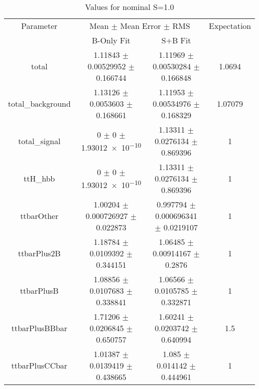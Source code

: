 \begin{table}
\centering
\caption{Values for nominal S=1.0}
\begin{tabular}{cccc}
\toprule
Parameter & \multicolumn{2}{c}{Mean $\pm$ Mean Error $\pm$ RMS} & Expectation\\
 & B-Only Fit & S+B Fit & \\
\midrule
total & \num{1.11843} $\pm$ \num{0.00529952} $\pm$ \num{0.166744} & \num{1.11969} $\pm$ \num{0.00530284} $\pm$ \num{0.166848} & \num{1.0694}\\
total\_background & \num{1.13126} $\pm$ \num{0.0053603} $\pm$ \num{0.168661} & \num{1.11953} $\pm$ \num{0.00534976} $\pm$ \num{0.168329} & \num{1.07079}\\
total\_signal & \num{0} $\pm$ \num{0} $\pm$ \num{1.93012e-10} & \num{1.13311} $\pm$ \num{0.0276134} $\pm$ \num{0.869396} & \num{1}\\
ttH\_hbb & \num{0} $\pm$ \num{0} $\pm$ \num{1.93012e-10} & \num{1.13311} $\pm$ \num{0.0276134} $\pm$ \num{0.869396} & \num{1}\\
ttbarOther & \num{1.00204} $\pm$ \num{0.000726927} $\pm$ \num{0.022873} & \num{0.997794} $\pm$ \num{0.000696341} $\pm$ \num{0.0219107} & \num{1}\\
ttbarPlus2B & \num{1.18784} $\pm$ \num{0.0109392} $\pm$ \num{0.344151} & \num{1.06485} $\pm$ \num{0.00914167} $\pm$ \num{0.2876} & \num{1}\\
ttbarPlusB & \num{1.08856} $\pm$ \num{0.0107683} $\pm$ \num{0.338841} & \num{1.06566} $\pm$ \num{0.0105785} $\pm$ \num{0.332871} & \num{1}\\
ttbarPlusBBbar & \num{1.71206} $\pm$ \num{0.0206845} $\pm$ \num{0.650757} & \num{1.60241} $\pm$ \num{0.0203742} $\pm$ \num{0.640994} & \num{1.5}\\
ttbarPlusCCbar & \num{1.01387} $\pm$ \num{0.0139419} $\pm$ \num{0.438665} & \num{1.085} $\pm$ \num{0.014142} $\pm$ \num{0.444961} & \num{1}\\
\bottomrule
\end{tabular}
\end{table}